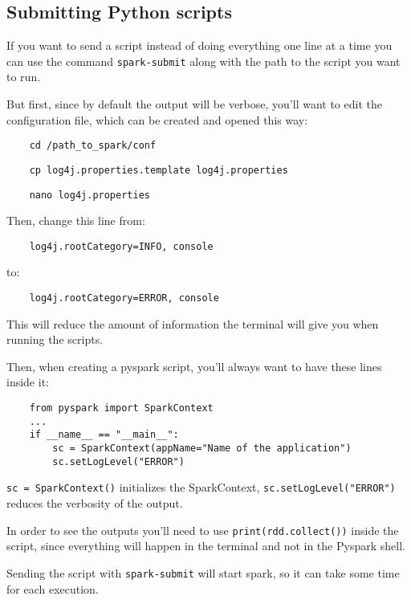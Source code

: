 \subsection{Submitting Python scripts}

If you want to send a script instead of doing everything one line at a time you can use the command \texttt{spark-submit} along with the path to the script you want to run.

But first, since by default the output will be verbose, you'll want to edit the configuration file, which can be created and opened this way:

\begin{lstlisting}
    cd /path_to_spark/conf
\end{lstlisting}

\begin{lstlisting}
    cp log4j.properties.template log4j.properties
\end{lstlisting}

\begin{lstlisting}
    nano log4j.properties
\end{lstlisting}

Then, change this line from:

\begin{lstlisting}
    log4j.rootCategory=INFO, console
\end{lstlisting}

to:

\begin{lstlisting}
    log4j.rootCategory=ERROR, console
\end{lstlisting}

This will reduce the amount of information the terminal will give you when running the scripts.

Then, when creating a pyspark script, you'll always want to have these lines inside it:

\begin{lstlisting}
    from pyspark import SparkContext
    ...
    if __name__ == "__main__":
        sc = SparkContext(appName="Name of the application")
        sc.setLogLevel("ERROR")
\end{lstlisting}

\texttt{sc = SparkContext()} initializes the SparkContext, \texttt{sc.setLogLevel("ERROR")} reduces the verbosity of the output.

In order to see the outputs you'll need to use \texttt{print(rdd.collect())} inside the script, since everything will happen in the terminal and not in the Pyspark shell.

Sending the script with \texttt{spark-submit} will start spark, so it can take some time for each execution.

